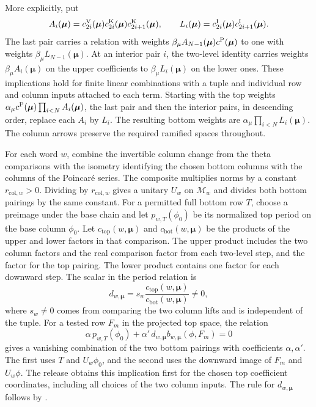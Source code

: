 More explicitly, put
\[
 A_i(\boldsymbol\mu)
  =c^{\rm V}_{2i}(\boldsymbol\mu)c^{\rm K}_{2i}(\boldsymbol\mu)
    c^{\rm K}_{2i+1}(\boldsymbol\mu),\qquad
 L_i(\boldsymbol\mu)
  =c^{\rm I}_{2i}(\boldsymbol\mu)c^{\rm I}_{2i+1}(\boldsymbol\mu).
\]
The last pair carries a relation with weights
\(\beta_\mu A_{N-1}(\boldsymbol\mu)c^{\rm P}(\boldsymbol\mu)\)
to one with weights \(\beta_\mu L_{N-1}(\boldsymbol\mu)\).
At an interior pair \(i\), the two-level identity carries weights
\(\beta_\mu A_i(\boldsymbol\mu)\) on the upper coefficients to
\(\beta_\mu L_i(\boldsymbol\mu)\) on the lower ones. These
implications hold for finite linear combinations with a tuple
and individual row and column inputs attached to each term.
Starting with the top
weights \(\alpha_\mu c^{\rm P}(\boldsymbol\mu)
\prod_{i<N} A_i(\boldsymbol\mu)\), the last pair and then the
interior pairs, in descending order, replace each \(A_i\) by \(L_i\).
The resulting bottom weights are
\(\alpha_\mu\prod_{i<N} L_i(\boldsymbol\mu)\). The column arrows
preserve the required ramified spaces throughout.

For each word \(w\), combine the invertible column change from the
theta comparisons with the isometry identifying the chosen bottom
columns with the columns of the Poincar\'e series. The composite
multiplies norms by a constant \(r_{\mathrm{col},w}>0\). Dividing by
\(r_{\mathrm{col},w}\) gives a unitary \(U_w\) on \(\mathcal M_w\) and
divides both bottom pairings by the same constant. For a permitted full
bottom row \(T\), choose a preimage under the base chain and let
\(p_{w,T}(\phi_0)\) be its normalized top period on the base column
\(\phi_0\). Let \(c_{\mathrm{top}}(w,\boldsymbol\mu)\) and
\(c_{\mathrm{bot}}(w,\boldsymbol\mu)\) be the products of the upper and
lower factors in that comparison. The upper product includes the two
column factors and the real comparison factor from each two-level step,
and the factor for the top pairing. The lower product contains one
factor for each downward step. The scalar in the period relation is
\[
 d_{w,\boldsymbol\mu}
   =s_w\frac{c_{\mathrm{top}}(w,\boldsymbol\mu)}
              {c_{\mathrm{bot}}(w,\boldsymbol\mu)}\ne0,
\]
where \(s_w\ne0\) comes from comparing the two column lifts and is
independent of the tuple. For a tested row \(F_m\) in the projected
top space, the relation
\[
 \alpha\,p_{w,T}(\phi_0)
   +\alpha'\,d_{w,\boldsymbol\mu} b_{w,\boldsymbol\mu}(\phi,F_m)=0
\]
gives a vanishing combination of the two bottom pairings with
coefficients \(\alpha,\alpha'\). The first uses \(T\) and \(U_w\phi_0\),
and the second uses the downward image of \(F_m\) and \(U_w\phi\).
The release obtains this implication first for the chosen
top coefficient coordinates, including all choices of the two
column inputs. The rule for \(d_{w,\boldsymbol\mu}\) follows by
.

